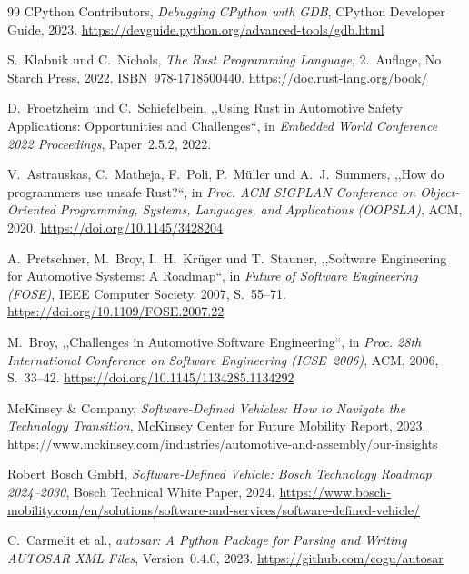 ﻿\documentclass[12pt,a4paper,twoside]{article}
\newcommand{\doi}[1]{\url{https://doi.org/#1}}
\begin{document}
\begin{thebibliography}{99}
  {CPython Contributors},
  \textit{Debugging CPython with GDB},
  CPython Developer Guide, 2023.
  \url{https://devguide.python.org/advanced-tools/gdb.html}


  S.~Klabnik und C.~Nichols,
  \textit{The Rust Programming Language},
  2.~Auflage, No Starch Press, 2022.
  ISBN~978-1718500440.
  \url{https://doc.rust-lang.org/book/}

  D.~Froetzheim und C.~Schiefelbein,
  ,,Using Rust in Automotive Safety Applications: Opportunities and Challenges``,
  in \textit{Embedded World Conference 2022 Proceedings}, Paper~2.5.2, 2022.

  V.~Astrauskas, C.~Matheja, F.~Poli, P.~Müller und A.~J.~Summers,
  ,,How do programmers use unsafe Rust?``,
  in \textit{Proc. ACM SIGPLAN Conference on Object-Oriented Programming,
  Systems, Languages, and Applications (OOPSLA)}, ACM, 2020.
  \doi{10.1145/3428204}


  A.~Pretschner, M.~Broy, I.~H.~Krüger und T.~Stauner,
  ,,Software Engineering for Automotive Systems: A Roadmap``,
  in \textit{Future of Software Engineering (FOSE)},
  IEEE Computer Society, 2007, S.~55--71.
  \doi{10.1109/FOSE.2007.22}

  M.~Broy,
  ,,Challenges in Automotive Software Engineering``,
  in \textit{Proc. 28th International Conference on Software Engineering
  (ICSE~2006)}, ACM, 2006, S.~33--42.
  \doi{10.1145/1134285.1134292}

  {McKinsey \& Company},
  \textit{Software-Defined Vehicles: How to Navigate the Technology Transition},
  McKinsey Center for Future Mobility Report, 2023.
  \url{https://www.mckinsey.com/industries/automotive-and-assembly/our-insights}

  {Robert Bosch GmbH},
  \textit{Software-Defined Vehicle: Bosch Technology Roadmap 2024--2030},
  Bosch Technical White Paper, 2024.
  \url{https://www.bosch-mobility.com/en/solutions/software-and-services/software-defined-vehicle/}


  C.~Carmelit et al.,
  \textit{autosar: A Python Package for Parsing and Writing AUTOSAR XML Files},
  Version~0.4.0, 2023.
  \url{https://github.com/cogu/autosar}


\end{thebibliography}
\end{document}
